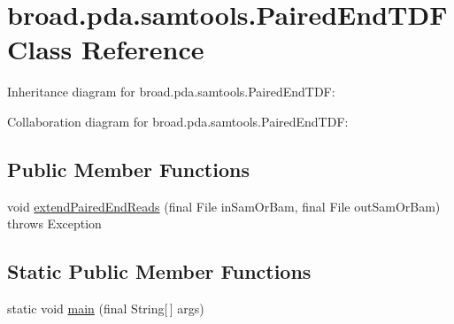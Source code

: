 \hypertarget{classbroad_1_1pda_1_1samtools_1_1_paired_end_t_d_f}{\section{broad.\+pda.\+samtools.\+Paired\+End\+T\+D\+F Class Reference}
\label{classbroad_1_1pda_1_1samtools_1_1_paired_end_t_d_f}
}


Inheritance diagram for broad.\+pda.\+samtools.\+Paired\+End\+T\+D\+F\+:


Collaboration diagram for broad.\+pda.\+samtools.\+Paired\+End\+T\+D\+F\+:
\subsection*{Public Member Functions}
\begin{DoxyCompactItemize}
\item 
void \hyperlink{classbroad_1_1pda_1_1samtools_1_1_paired_end_t_d_f_ab5c785fc58811bad61927ebc1c602a33}{extend\+Paired\+End\+Reads} (final File in\+Sam\+Or\+Bam, final File out\+Sam\+Or\+Bam)  throws Exception
\end{DoxyCompactItemize}
\subsection*{Static Public Member Functions}
\begin{DoxyCompactItemize}
\item 
static void \hyperlink{classbroad_1_1pda_1_1samtools_1_1_paired_end_t_d_f_a5b1217df4783fb68edb1834de88f7c06}{main} (final String\mbox{[}$\,$\mbox{]} args)
\end{DoxyCompactItemize}
